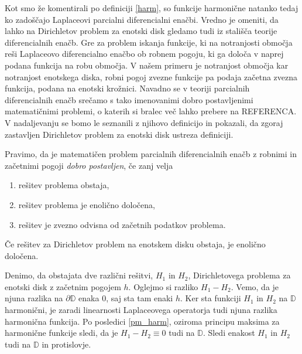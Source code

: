 \documentclass[mat1, tisk]{fmfdelo}
\begin{document}
    Kot smo že komentirali po definiciji \ref{harm}, so funkcije harmonične natanko tedaj ko zadoščajo Laplaceovi parcialni diferencialni enačbi.   
    Vredno je omeniti, da lahko na Dirichletov problem za enotski disk gledamo tudi iz stališča teorije diferencialnih enačb. Gre za problem iskanja funkcije, ki na notranjosti območja reši Laplaceovo diferencialno enačbo ob robnem pogoju, ki ga določa v naprej podana funkcija na robu območja.     
    V našem primeru je notranjost območja kar notranjost enotskega diska, robni pogoj zvezne funkcije pa podaja začetna zvezna funkcija, podana na enotski krožnici.
    Navadno se v teoriji parcialnih diferencialnih enačb srečamo s tako imenovanimi dobro postavljenimi matematičnimi problemi, o katerih si bralec več lahko prebere na REFERENCA.     
    V nadaljevanju se bomo le seznanili z njihovo definicijo in pokazali, da zgoraj zastavljen Dirichletov problem za enotski disk ustreza definiciji. 

    \begin{definicija}[J. Hadamard]
        \label{def_dp}
        Pravimo, da je matematičen problem parcialnih diferencialnih enačb z robnimi in začetnimi pogoji \emph{dobro postavljen}, če zanj velja
        \begin{enumerate}[label={\Alph*)}]
            \item rešitev problema obstaja,
            \item rešitev problema je enolično določena,
            \item rešitev je zvezno odvisna od začetnih podatkov problema.
        \end{enumerate}
    \end{definicija}

    \begin{lema}
        \label{enolicno}
        Če rešitev za Dirichletov problem na enotskem disku obstaja, je enolično določena.
    \end{lema}
    \begin{dokaz}
        Denimo, da obstajata dve različni rešitvi, $H_1$ in $H_2$, Dirichletovega problema za enotski disk z začetnim pogojem $h$.
        Oglejmo si razliko $H_1 - H_2$. Vemo, da je njuna razlika na $\partial \mathbb{D}$ enaka $0$, saj sta tam enaki $h$. 
        Ker sta funkciji $H_1$ in $H_2$ na $\mathbb{D}$ harmonični, je zaradi linearnosti Laplaceovega operatorja tudi njuna razlika harmonična funkcija. 
        Po posledici \ref{pm_harm}, oziroma principu maksima za harmonične funkcije sledi, da je $H_1 - H_2 \equiv 0$ tudi na $\mathbb{D}$. Sledi enakost $H_1$ in $H_2$ tudi na $\mathbb{D}$ in protislovje. 
    \end{dokaz}
    
\end{document}
